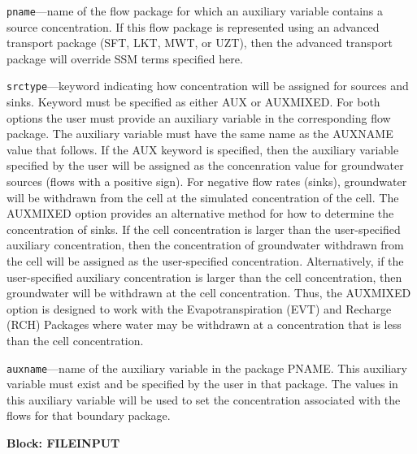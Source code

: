 \begin{description}
\item \texttt{pname}---name of the flow package for which an auxiliary variable contains a source concentration.  If this flow package is represented using an advanced transport package (SFT, LKT, MWT, or UZT), then the advanced transport package will override SSM terms specified here.

\item \texttt{srctype}---keyword indicating how concentration will be assigned for sources and sinks.  Keyword must be specified as either AUX or AUXMIXED.  For both options the user must provide an auxiliary variable in the corresponding flow package.  The auxiliary variable must have the same name as the AUXNAME value that follows.  If the AUX keyword is specified, then the auxiliary variable specified by the user will be assigned as the concenration value for groundwater sources (flows with a positive sign).  For negative flow rates (sinks), groundwater will be withdrawn from the cell at the simulated concentration of the cell.  The AUXMIXED option provides an alternative method for how to determine the concentration of sinks.  If the cell concentration is larger than the user-specified auxiliary concentration, then the concentration of groundwater withdrawn from the cell will be assigned as the user-specified concentration.  Alternatively, if the user-specified auxiliary concentration is larger than the cell concentration, then groundwater will be withdrawn at the cell concentration.  Thus, the AUXMIXED option is designed to work with the Evapotranspiration (EVT) and Recharge (RCH) Packages where water may be withdrawn at a concentration that is less than the cell concentration.

\item \texttt{auxname}---name of the auxiliary variable in the package PNAME.  This auxiliary variable must exist and be specified by the user in that package.  The values in this auxiliary variable will be used to set the concentration associated with the flows for that boundary package.

\end{description}
\item \textbf{Block: FILEINPUT}

